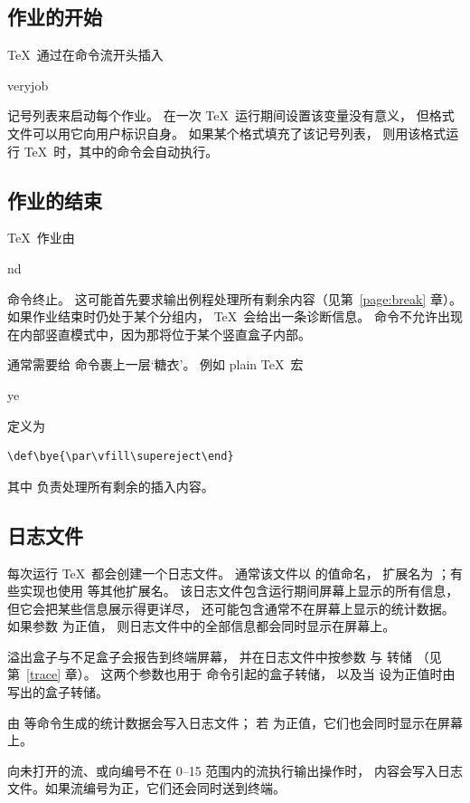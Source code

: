 \documentclass[a4paper]{rapport3}
\makeatletter
\def\cstoidx#1\par{\index{#1@\cs{#1}}}
\def\csidx#1{\cstoidx #1\par\cs{#1}}
\makeatother
\begin{document}
\subsection{作业的开始}

\TeX\ 通过在命令流开头插入 \csidx{everyjob} 记号列表来启动每个作业。
在一次 \TeX\ 运行期间设置该变量没有意义，
但格式文件可以用它向用户标识自身。
如果某个格式填充了该记号列表，
则用该格式运行 \TeX\ 时，其中的命令会自动执行。

\subsection{作业的结束}

\TeX\ 作业由 \csidx{end} 命令终止。
这可能首先要求输出例程处理所有剩余内容（见第~\ref{page:break} 章）。
如果作业结束时仍处于某个分组内，
\TeX\ 会给出一条诊断信息。
 命令不允许出现在内部竖直模式中，因为那将位于某个竖直盒子内部。

通常需要给  命令裹上一层`糖衣'。
例如 plain \TeX\ 宏 \csidx{bye} 定义为
\begin{verbatim}
\def\bye{\par\vfill\supereject\end}
\end{verbatim}
其中  负责处理所有剩余的插入内容。

\subsection{日志文件}

每次运行 \TeX\ 都会创建一个日志文件。
通常该文件以  的值命名，
扩展名为 ；有些实现也使用  等其他扩展名。
该日志文件包含运行期间屏幕上显示的所有信息，
但它会把某些信息展示得更详尽，
还可能包含通常不在屏幕上显示的统计数据。
如果参数  为正值，
则日志文件中的全部信息都会同时显示在屏幕上。

溢出盒子与不足盒子会报告到终端屏幕，
并在日志文件中按参数  与  转储
（见第~\ref{trace} 章）。
这两个参数也用于  命令引起的盒子转储，
以及当  设为正值时由  写出的盒子转储。

由  等命令生成的统计数据会写入日志文件；
若  为正值，它们也会同时显示在屏幕上。

向未打开的流、或向编号不在 0--15 范围内的流执行输出操作时，
内容会写入日志文件。如果流编号为正，它们还会同时送到终端。
\end{document}
